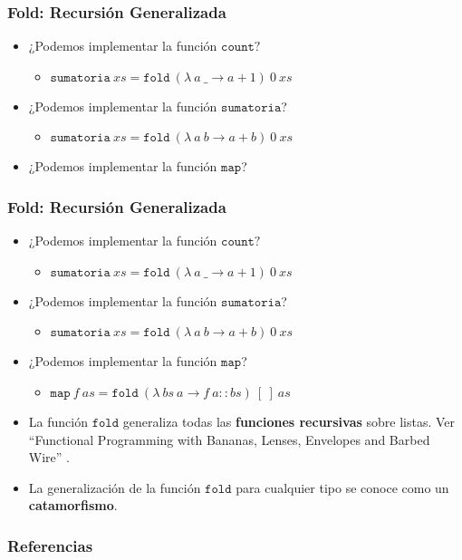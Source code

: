 \documentclass{beamer}
\begin{document}
\begin{frame}
    \frametitle{Fold: Recursi\'on Generalizada}
    \begin{itemize}
        \item{¿Podemos implementar la funci\'on $\mathtt{count}?$
            \begin{itemize}
                \item{$\mathtt{sumatoria}\ xs=\mathtt{fold}\ (\lambda\ a\ \_\rightarrow a+1)
                    \ 0\ xs$}
            \end{itemize}
        }
        \item{¿Podemos implementar la funci\'on $\mathtt{sumatoria}$?
            \begin{itemize}
                \item{$\mathtt{sumatoria}\ xs=\mathtt{fold}\ (\lambda\ a\ b\rightarrow a+b)
                    \ 0\ xs$}
            \end{itemize}
        }
        \item{¿Podemos implementar la funci\'on $\mathtt{map}$?}
    \end{itemize}
    
\end{frame}

\begin{frame}
    \frametitle{Fold: Recursi\'on Generalizada}
    \begin{itemize}
        \item{¿Podemos implementar la funci\'on $\mathtt{count}?$
            \begin{itemize}
                \item{$\mathtt{sumatoria}\ xs=\mathtt{fold}\ (\lambda\ a\ \_\rightarrow a+1)
                    \ 0\ xs$}
            \end{itemize}
        }
        \item{¿Podemos implementar la funci\'on $\mathtt{sumatoria}$?
            \begin{itemize}
                \item{$\mathtt{sumatoria}\ xs=\mathtt{fold}\ (\lambda\ a\ b\rightarrow a+b)
                    \ 0\ xs$}
            \end{itemize}
        }
        \item{¿Podemos implementar la funci\'on $\mathtt{map}$?
            \begin{itemize}
                \item{$\mathtt{map}\ f\ as=\mathtt{fold}\ (\lambda\ bs\ a\rightarrow f\ a::bs)\ [\ ]\ as$}
            \end{itemize}
        }
        \item{La funci\'on $\mathtt{fold}$ generaliza todas las {\bf funciones recursivas}
        sobre listas. Ver ``Functional Programming with Bananas, Lenses, Envelopes and Barbed Wire''
        \cite{Meijer91functionalprogramming}.}
        \item{La generalizaci\'on de la funci\'on $\mathtt{fold}$ para cualquier tipo
        se conoce como un {\bf catamorfismo}.}
    \end{itemize}
\end{frame}

\begin{frame}
    \frametitle{Referencias}
    
    
\end{frame}
\end{document}
